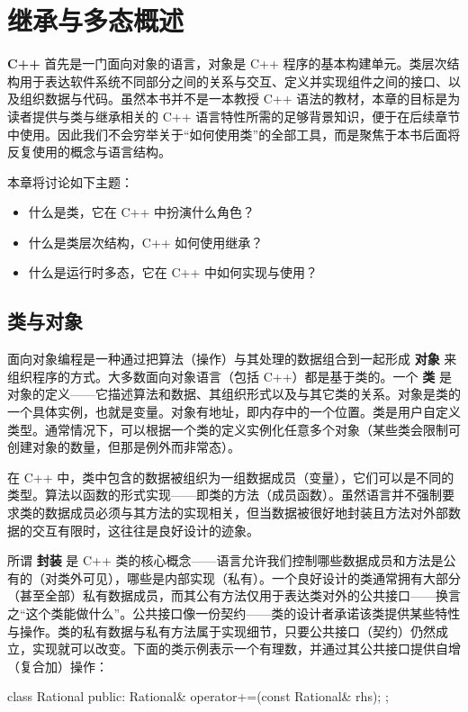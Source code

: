 \chapter{继承与多态概述}

\textbf{C++} 首先是一门面向对象的语言，对象是 C++ 程序的基本构建单元。类层次结构用于表达软件系统不同部分之间的关系与交互、定义并实现组件之间的接口、以及组织数据与代码。虽然本书并不是一本教授 C++ 语法的教材，本章的目标是为读者提供与类与继承相关的 C++ 语言特性所需的足够背景知识，便于在后续章节中使用。因此我们不会穷举关于“如何使用类”的全部工具，而是聚焦于本书后面将反复使用的概念与语言结构。

本章将讨论如下主题：

\begin{itemize}
\item 什么是类，它在 C++ 中扮演什么角色？
\item 什么是类层次结构，C++ 如何使用继承？
\item 什么是运行时多态，它在 C++ 中如何实现与使用？
\end{itemize}

\section{类与对象}

面向对象编程是一种通过把算法（操作）与其处理的数据组合到一起形成 \textbf{对象} 来组织程序的方式。大多数面向对象语言（包括 C++）都是基于类的。一个 \textbf{类} 是对象的定义——它描述算法和数据、其组织形式以及与其它类的关系。对象是类的一个具体实例，也就是变量。对象有地址，即内存中的一个位置。类是用户自定义类型。通常情况下，可以根据一个类的定义实例化任意多个对象（某些类会限制可创建对象的数量，但那是例外而非常态）。

在 C++ 中，类中包含的数据被组织为一组数据成员（变量），它们可以是不同的类型。算法以函数的形式实现——即类的方法（成员函数）。虽然语言并不强制要求类的数据成员必须与其方法的实现相关，但当数据被很好地封装且方法对外部数据的交互有限时，这往往是良好设计的迹象。

所谓 \textbf{封装} 是 C++ 类的核心概念——语言允许我们控制哪些数据成员和方法是公有的（对类外可见），哪些是内部实现（私有）。一个良好设计的类通常拥有大部分（甚至全部）私有数据成员，而其公有方法仅用于表达类对外的公共接口——换言之“这个类能做什么”。公共接口像一份契约——类的设计者承诺该类提供某些特性与操作。类的私有数据与私有方法属于实现细节，只要公共接口（契约）仍然成立，实现就可以改变。下面的类示例表示一个有理数，并通过其公共接口提供自增（复合加）操作：

\begin{code}
class Rational { 
public:
  Rational& operator+=(const Rational& rhs);
};
\end{code}

